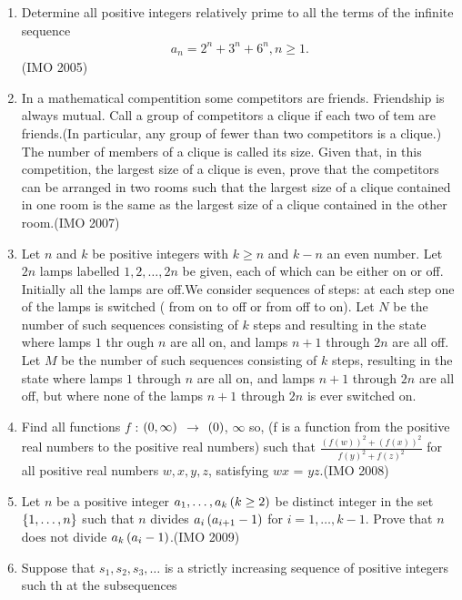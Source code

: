 \begin{enumerate}
\item Determine all positive integers relatively prime to all the terms of the infinite sequence
 \begin{align*}
 a_n={2^n}+{3^n}+{6^n},n\geq{1}.
\end{align*} \hfill(IMO 2005)
\item In a mathematical compentition some competitors are friends. Friendship is always mutual. Call a group of competitors a clique if each two of tem are friends.(In particular, any group of fewer than two competitors is a clique.) The number of members of a clique is called its size.                                    Given that, in this competition, the largest size of a clique is even, prove that the competitors can  be arranged in two rooms such that the largest size of  a clique contained in one room is the same as the largest size of a clique contained in the other room.\hfill(IMO 2007)
		\item  Let $n$ and $k$ be positive integers with $k\geq n$ and $k-n$ an even number. Let $2n$ lamps labelled $1, 2,\dots, 2n$ be given, each of which can be either on or off. Initially all the lamps are off.We consider sequences of steps: at each step one of the lamps is switched ( from on to off or from off to on).                                                       Let $N$ be the number of such sequences consisting of $    k$ steps and resulting in the state where lamps $1$ thr    ough $n$ are all on, and lamps $n + 1$ through $2n$ are     all off.                                         Let $M$ be the number of such sequences consisting of $k$ steps, resulting in the state where lamps $1$ through $n$ are all on, and lamps $n + 1$ through $2n$ are all off, but where none of the lamps $n + 1$ through $2n$ is ever switched on.  
		\item Find all functions $f$ : $\left(0,\infty\right)$ $\rightarrow$ $\left(0\right)$, $\infty$  so, (f is a function from the positive real numbers to the positive real numbers) such that $\frac{(f(w))^2 + (f(x))^2} {f(y)^2 + f(z)^2 }$  for all positive real numbers $w, x, y,z$, satisfying $wx$ = $yz$.\hfill(IMO 2008)
	\item Let $n$ be a positive integer $a_{1},\dots,a_{k}\left(k\geq 2\right)$ be distinct integer in the set $\left\{1 ,\dots, n\right\}$ such that $n$ divides $a_{i} \left(a_{i+1}-1\right)$ for $i=1,\dots, k-1$. Prove that $n$ does not divide $ a_{k} \left(a_{i}-1\right)$.\hfill(IMO 2009)
	\item Suppose that $s_{1}, s_{2}, s_{3},\dots $ is a strictly increasing sequence of positive integers such th    at the subsequences       

\end{enumerate}
